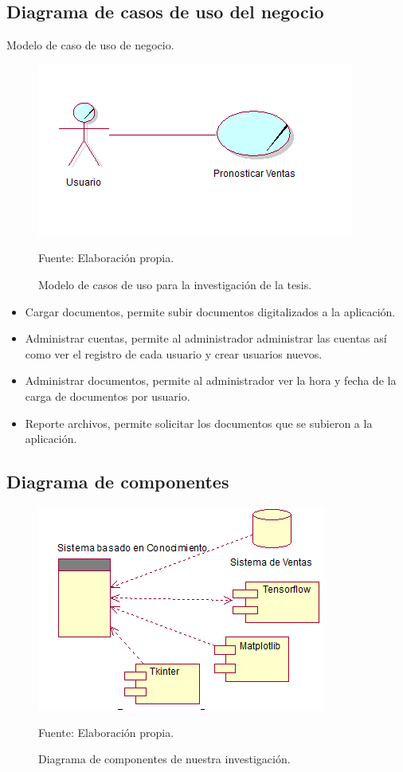 \subsection{Diagrama de casos de uso del negocio}
Modelo de caso de uso de negocio.

\begin{figure}[h!]
	\centering
		\includegraphics[scale=0.6]{imagenes/casosdeusonegocio.png}
		\caption{Modelo de casos de uso para la investigación de la tesis.}
	\begin{center}
    Fuente: Elaboración propia.
    \end{center}
	\label{fig:diagramaCasosUsoTesis}
\end{figure}
\begin{itemize}
    \item Cargar documentos, permite subir documentos digitalizados a la aplicación.
    \item Administrar cuentas, permite al administrador administrar las cuentas así como ver el registro de cada usuario y crear usuarios nuevos.
    \item Administrar documentos, permite al administrador ver la hora y fecha de la carga de documentos por usuario.
    \item Reporte archivos, permite solicitar los documentos que se subieron a la aplicación.
\end{itemize}

\subsection{Diagrama de componentes}
\begin{figure}[h!]
	\centering
		\includegraphics[scale=1]{imagenes/diagramacomponentes.png}
		\caption{Diagrama de componentes de nuestra investigación.}
	\begin{center}
    Fuente: Elaboración propia.
    \end{center}
	\label{fig:diagramadecomponentes}
\end{figure}
\newpage
